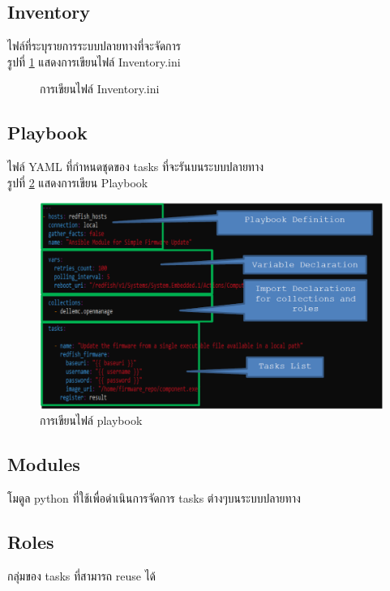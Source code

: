 \subsection{Inventory}
\hspace{0.5in} ไฟล์ที่ระบุรายการระบบปลายทางที่จะจัดการ \\
รูปที่ \ref{fig:inventory.ini} แสดงการเขียนไฟล์ Inventory.ini

\begin{figure}
  \centering
  \caption[Sample figure]{การเขียนไฟล์ Inventory.ini}
  \label{fig:inventory.ini}
\end{figure}

\subsection{Playbook}
\hspace{0.5in} ไฟล์ YAML ที่กำหนดชุดของ tasks ที่จะรันบนระบบปลายทาง \\
รูปที่ \ref{fig:ansible_playbook} แสดงการเขียน Playbook

\begin{figure}
  \begin{center}
    \includegraphics[scale=0.9]{playbook.png}
  \end{center}
  \caption[Poem]{การเขียนไฟล์ playbook}
  \label{fig:ansible_playbook}
\end{figure}

\subsection{Modules}
\hspace{0.5in} โมดูล python ที่ใช้เพื่อดำเนินการจัดการ tasks ต่างๆบนระบบปลายทาง
\subsection{Roles}
\hspace{0.5in} กลุ่มของ tasks ที่สามารถ reuse ได้

